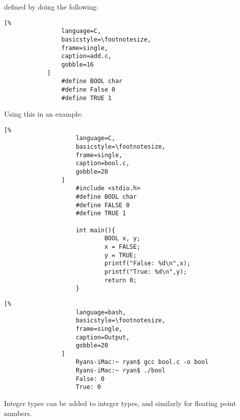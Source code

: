 \documentclass[crop=false,class=book]{standalone}
\begin{document}
            defined by doing the following:
            \newpage
            \begin{lstlisting}[%
                language=C,
                basicstyle=\footnotesize,
                frame=single,
                caption=add.c,
                gobble=16
            ]
                #define BOOL char
                #define False 0
                #define TRUE 1
            \end{lstlisting}
            Using this in an example:
            \newline
            \begin{minipage}[t]{.48\textwidth}
                \centering
                \begin{lstlisting}[%
                    language=C,
                    basicstyle=\footnotesize,
                    frame=single,
                    caption=bool.c,
                    gobble=20
                ]
                    #include <stdio.h>
                    #define BOOL char
                    #define FALSE 0
                    #define TRUE 1
                    
                    int main(){
                            BOOL x, y;
                            x = FALSE;
                            y = TRUE;
                            printf("False: %d\n",x);
                            printf("True: %d\n",y);
                            return 0;
                    }
                \end{lstlisting}
            \end{minipage}\hfill
            \begin{minipage}[t]{.48\textwidth}
                \centering
                \begin{lstlisting}[%
                    language=bash,
                    basicstyle=\footnotesize,
                    frame=single,
                    caption=Output,
                    gobble=20
                ]
                    Ryans-iMac:~ ryan$ gcc bool.c -o bool
                    Ryans-iMac:~ ryan$ ./bool
                    False: 0
                    True: 0
                \end{lstlisting}
            \end{minipage}
            Integer types can be added to integer types,
            and similarly for floating point numbers.\newline
\end{document}
